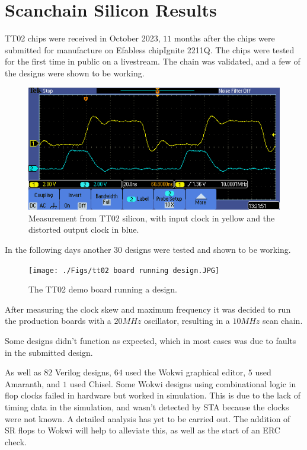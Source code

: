 \section{Scanchain Silicon Results}
\label{sec:scan_chain_res}

TT02 chips were received in October 2023, \(11\) months after the chips were submitted for manufacture on Efabless chipIgnite 2211Q.
The chips were tested for the first time in public on a livestream\cite{siliconalive}.
The chain was validated, and a few of the designs were shown to be working.

\begin{figure}[htp]
\centering
\includegraphics[width=\columnwidth]{./Figs/tt02_clock_out.png}
\caption{Measurement from TT02 silicon, with input clock in yellow and the distorted output clock in blue.}
\label{fig:TT03_clock_out.png}
\end{figure}

In the following days another \(30\) designs were tested and shown to be working.

\begin{figure}[htp]
\centering
\texttt{[image: ./Figs/tt02 board running design.JPG]}
\caption{The TT02 demo board running a design.}
\label{fig:TT02_demo_board_design}
\end{figure}

After measuring the clock skew and maximum frequency it was decided to run the production boards with a \(20MHz\) oscillator, resulting in a \(10MHz\) scan chain.

Some designs didn’t function as expected, which in most cases was due to faults in the submitted design.

As well as \(82\) Verilog designs, \(64\) used the Wokwi graphical editor, \(5\) used Amaranth, and \(1\) used Chisel.
Some Wokwi designs using combinational logic in flop clocks failed in hardware but worked in simulation.
This is due to the lack of timing data in the simulation, and wasn’t detected by STA because the clocks were not known.
A detailed analysis has yet to be carried out.
The addition of SR flops to Wokwi will help to alleviate this, as well as the start of an ERC check.

